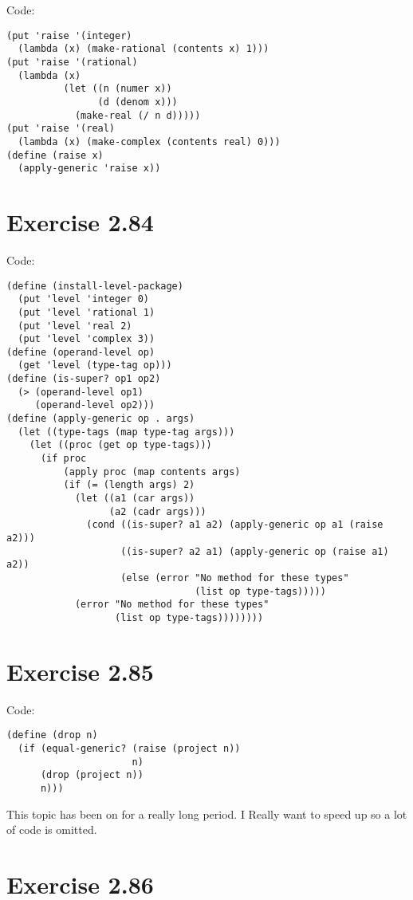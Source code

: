 \documentclass[../main.tex]{subfiles}
\begin{document}
Code:

\begin{lstlisting}
(put 'raise '(integer)
  (lambda (x) (make-rational (contents x) 1)))
(put 'raise '(rational)
  (lambda (x)
          (let ((n (numer x))
                (d (denom x)))
            (make-real (/ n d)))))
(put 'raise '(real)
  (lambda (x) (make-complex (contents real) 0)))
(define (raise x)
  (apply-generic 'raise x))
\end{lstlisting}

\section{Exercise 2.84}

Code:

\begin{lstlisting}
(define (install-level-package)
  (put 'level 'integer 0)
  (put 'level 'rational 1)
  (put 'level 'real 2)
  (put 'level 'complex 3))
(define (operand-level op)
  (get 'level (type-tag op)))
(define (is-super? op1 op2)
  (> (operand-level op1)
     (operand-level op2)))
(define (apply-generic op . args)
  (let ((type-tags (map type-tag args)))
    (let ((proc (get op type-tags)))
      (if proc
          (apply proc (map contents args)
          (if (= (length args) 2)
            (let ((a1 (car args))
                  (a2 (cadr args)))
              (cond ((is-super? a1 a2) (apply-generic op a1 (raise a2)))
                    ((is-super? a2 a1) (apply-generic op (raise a1) a2))
                    (else (error "No method for these types"
                                 (list op type-tags)))))
            (error "No method for these types"
                   (list op type-tags))))))))
\end{lstlisting}

\section{Exercise 2.85}

Code:

\begin{lstlisting}
(define (drop n)
  (if (equal-generic? (raise (project n))
                      n)
      (drop (project n))
      n)))
\end{lstlisting}

This topic has been on for a really long period. I Really
 want to speed up so a lot of code is omitted.

\section{Exercise 2.86}
\end{document}
